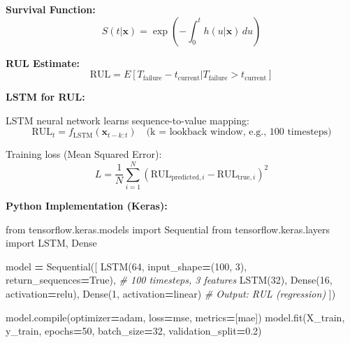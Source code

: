 \documentclass[
]{article}
\newenvironment{Shaded}{\begin{snugshade}}{\end{snugshade}}
\newcommand{\BuiltInTok}[1]{#1}
\newcommand{\CommentTok}[1]{\textcolor[rgb]{0.56,0.35,0.01}{\textit{#1}}}
\newcommand{\DecValTok}[1]{\textcolor[rgb]{0.00,0.00,0.81}{#1}}
\newcommand{\FloatTok}[1]{\textcolor[rgb]{0.00,0.00,0.81}{#1}}
\newcommand{\ImportTok}[1]{#1}
\newcommand{\NormalTok}[1]{#1}
\newcommand{\OperatorTok}[1]{\textcolor[rgb]{0.81,0.36,0.00}{\textbf{#1}}}
\newcommand{\StringTok}[1]{\textcolor[rgb]{0.31,0.60,0.02}{#1}}
\newcommand{\VariableTok}[1]{\textcolor[rgb]{0.00,0.00,0.00}{#1}}
\begin{document}
\textbf{Survival Function:} \[
S(t | \mathbf{x}) = \exp\left( -\int_0^t h(u | \mathbf{x}) \, du \right)
\]

\textbf{RUL Estimate:} \[
\text{RUL} = E[T_{\text{failure}} - t_{\text{current}} | T_{\text{failure}} > t_{\text{current}}]
\]

\textbf{LSTM for RUL:}

LSTM neural network learns sequence-to-value mapping: \[
\text{RUL}_t = f_{\text{LSTM}}(\mathbf{x}_{t-k:t}) \quad \text{(k = lookback window, e.g., 100 timesteps)}
\]

Training loss (Mean Squared Error): \[
L = \frac{1}{N} \sum_{i=1}^N (\text{RUL}_{\text{predicted},i} - \text{RUL}_{\text{true},i})^2
\]

\textbf{Python Implementation (Keras):}

\begin{Shaded}
\begin{Highlighting}[]
\ImportTok{from}\NormalTok{ tensorflow.keras.models }\ImportTok{import}\NormalTok{ Sequential}
\ImportTok{from}\NormalTok{ tensorflow.keras.layers }\ImportTok{import}\NormalTok{ LSTM, Dense}

\NormalTok{model }\OperatorTok{=}\NormalTok{ Sequential([}
\NormalTok{    LSTM(}\DecValTok{64}\NormalTok{, input\_shape}\OperatorTok{=}\NormalTok{(}\DecValTok{100}\NormalTok{, }\DecValTok{3}\NormalTok{), return\_sequences}\OperatorTok{=}\VariableTok{True}\NormalTok{),  }\CommentTok{\# 100 timesteps, 3 features}
\NormalTok{    LSTM(}\DecValTok{32}\NormalTok{),}
\NormalTok{    Dense(}\DecValTok{16}\NormalTok{, activation}\OperatorTok{=}\StringTok{\textquotesingle{}relu\textquotesingle{}}\NormalTok{),}
\NormalTok{    Dense(}\DecValTok{1}\NormalTok{, activation}\OperatorTok{=}\StringTok{\textquotesingle{}linear\textquotesingle{}}\NormalTok{)  }\CommentTok{\# Output: RUL (regression)}
\NormalTok{])}

\NormalTok{model.}\BuiltInTok{compile}\NormalTok{(optimizer}\OperatorTok{=}\StringTok{\textquotesingle{}adam\textquotesingle{}}\NormalTok{, loss}\OperatorTok{=}\StringTok{\textquotesingle{}mse\textquotesingle{}}\NormalTok{, metrics}\OperatorTok{=}\NormalTok{[}\StringTok{\textquotesingle{}mae\textquotesingle{}}\NormalTok{])}
\NormalTok{model.fit(X\_train, y\_train, epochs}\OperatorTok{=}\DecValTok{50}\NormalTok{, batch\_size}\OperatorTok{=}\DecValTok{32}\NormalTok{, validation\_split}\OperatorTok{=}\FloatTok{0.2}\NormalTok{)}
\end{Highlighting}
\end{Shaded}
\end{document}
